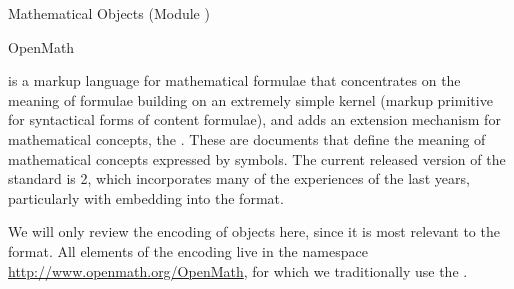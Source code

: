 \begin{tchapter}[id=mobj,short=Mathematical Objects]{Mathematical Objects (Module {})}
\begin{tsection}[id=openmath]{OpenMath}
  
  {\openmath} is a markup language for mathematical formulae that concentrates on the
  meaning of formulae building on an extremely simple kernel (markup primitive for
  syntactical forms of content formulae), and adds an extension mechanism for mathematical
  concepts, the {}.  These are
  {} documents that define the meaning of mathematical concepts
  expressed by {\openmath} symbols.  The current released version of the {\openmath}
  standard is {\openmath}2, which incorporates many of the experiences of the last years,
  particularly with embedding {\openmath} into the {\omdoc} format.

  We will only review the {\xml} encoding of {\openmath} objects here, since it is most
  relevant to the {\omdoc} format. All elements of the {\xml} encoding live in the
  {namespace} \url{http://www.openmath.org/OpenMath}, for
  which we traditionally use the {}
  {}.


\end{tsection}
\end{tchapter}
